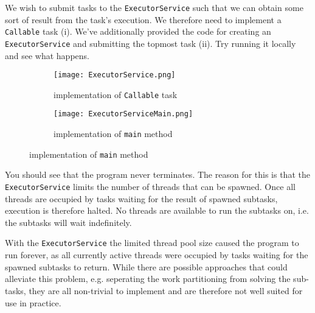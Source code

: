 \documentclass[main.tex]{subfiles}
\begin{document}
\begin{example}
    We wish to submit tasks to the \texttt{ExecutorService} such that we can obtain some sort of result from the task's execution. We therefore need to implement a \texttt{Callable} task (i). We've additionally provided the code for creating an \texttt{ExecutorService} and submitting the topmost task (ii). Try running it locally and see what happens. 
    \begin{figure}[H]
        \centering
        \begin{subfigure}{.5\textwidth}
            \centering
            \texttt{[image: ExecutorService.png]}
            \caption{implementation of \texttt{Callable} task}
        \end{subfigure}%
        \begin{subfigure}{.5\textwidth}
            \centering
            \texttt{[image: ExecutorServiceMain.png]}
            \caption{implementation of \texttt{main} method}
        \end{subfigure}
    \end{figure}
    \noindent You should see that the program never terminates. The reason for this is that the \texttt{ExecutorService} limits the number of threads that can be spawned. Once all threads are occupied by tasks waiting for the result of spawned subtasks, execution is therefore halted. No threads are available to run the subtasks on, i.e. the subtasks will wait indefinitely.
\end{example}
With the \texttt{ExecutorService} the limited thread pool size caused the program to run forever, as all currently active threads were occupied by tasks waiting for the spawned subtasks to return. While there are possible approaches that could alleviate this problem, e.g. seperating the work partitioning from solving the sub-tasks, they are all non-trivial to implement and are therefore not well suited for use in practice.

\end{document}
